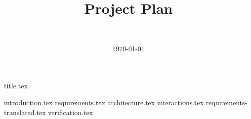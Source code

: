 \documentclass[final]{report}
\title{Project Plan}
\author{~}
\date{\today}
\begin{document}

{title.tex}
\newpage
\tableofcontents

\newpage
{}
{introduction.tex}
{requirements.tex}
{architecture.tex}
{interactions.tex}
{requirements-translated.tex}
{verification.tex}
\newpage
{}

\end{document}
